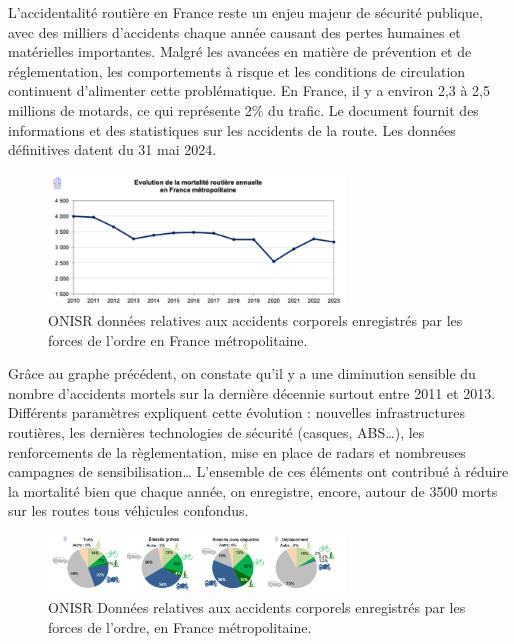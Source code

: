 \documentclass{article}
\begin{document}
L’accidentalité routière en France reste un enjeu majeur de sécurité publique, avec des milliers d’accidents chaque année causant des pertes humaines et matérielles importantes. Malgré les avancées en matière de prévention et de réglementation, les comportements à risque et les conditions de circulation continuent d’alimenter cette problématique.
En France, il y a environ 2,3 à 2,5 millions de motards\cite{actiEouteNbMotardFr}, ce qui représente 2\%  du trafic.
Le document\cite{la_securite_routiere_accidentalite_2024} fournit des informations et des statistiques sur les accidents de la route. Les données définitives datent du 31 mai 2024.

\begin{figure}[h]
    \centering
    \includegraphics[width=0.7\textwidth]{images/evolution_mortalite_securite_routiere_france.png} 
    \caption{ONISR données relatives aux accidents corporels enregistrés par les forces de l'ordre en France métropolitaine.}
\end{figure}

Grâce au graphe précédent, on constate qu’il y a une diminution sensible du nombre d’accidents mortels sur la dernière décennie surtout entre 2011 et 2013. Différents paramètres expliquent cette évolution : nouvelles infrastructures routières, les dernières technologies de sécurité (casques, ABS…), les renforcements de la règlementation, mise en place de radars et nombreuses campagnes de sensibilisation… L’ensemble de ces éléments ont contribué à réduire la mortalité bien que chaque année, on enregistre, encore, autour de 3500 morts sur les routes tous véhicules confondus. 

\begin{figure}[h]
    \centering
    \includegraphics[width=0.7\textwidth]{images/camambert_accidents_differents_vehicules.png} 
    \caption{ONISR Données relatives aux accidents corporels enregistrés par les forces de l'ordre, en France métropolitaine.}
\end{figure}
\end{document}
